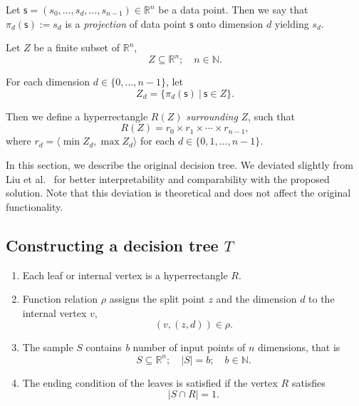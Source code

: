 
\begin{definition}
Let $\mathsf{s}=(s_0, \dots, s_d, \dots, s_{n-1})\in \mathbb{R}^n$ be a data point. Then we say that $\pi_d(\mathsf{s}):=s_d$ is a \emph{projection} of data point $\mathsf{s}$ onto  dimension $d$  yielding $s_d$.
\end{definition}

\begin{definition}
Let $Z$ be a finite subset of $\mathbb{R}^n$,
$$Z \subseteq \mathbb{R}^n ;\quad n \in \mathbb{N}.$$

For each dimension \(d \in\{0, \dots, n - 1\}\), let
$$Z_d = \{ \pi_d(\mathsf{s})\ |\ \mathsf{s} \in Z \}.$$

Then we define a hyperrectangle $R(Z)$ \emph{surrounding} $Z$, such that
$$R(Z) = r_0 \times r_1 \times \cdots \times r_{n-1},$$ where $r_d = \langle \min Z_d, \max Z_d \rangle$ for each $d \in \{0,1, \dots, n-1\}.$

\end{definition}




In this section, we describe the original decision tree.
We deviated slightly from Liu et al.~\cite{liu2008isolation} for better interpretability and comparability with the proposed solution.
Note that this deviation is theoretical and does not affect the original functionality.

\subsection{Constructing a decision tree $T$}
\begin{enumerate}

    \item Each leaf or internal vertex is a hyperrectangle $R$. 
    \item Function relation $\rho$ assigns the split point $z$ and the dimension $d$ to the internal vertex $v$,
    $$(v, (z,d)) \in \rho.$$
    \item The sample \(S\) contains \emph{b} number of input points of $n$ dimensions, that is
    $$S \subseteq \mathbb{R}^n ;\quad |S| = b; \quad b \in \mathbb{N}.$$
    \item The ending condition of the leaves is satisfied if the vertex \(R\) satisfies \[| S \cap R | = 1.\]
\end{enumerate}


